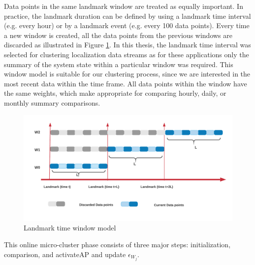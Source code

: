 Data points in the same landmark window are treated as equally important. In practice, the landmark duration can be defined by using a landmark time interval (e.g. every hour) or by a landmark event (e.g. every 100 data points). Every time a new window is created, all the data points from the previous windows are discarded as illustrated in Figure \ref{land}. In this thesis, the landmark time interval was selected for clustering localization data streams as for these applications only the summary of the system state within a particular window was required. This window model is suitable for our clustering process, since we are interested in the most recent data within the time frame. All data points within the window have the same weights, which make appropriate for comparing hourly, daily, or monthly summary comparisons. 




   \begin{figure}[ht]
    \centering
    \includegraphics[width = 11 cm]{image/Chapters/Chapter4/LANDMARK-2.png}
    \caption{Landmark time window model }
    \label{land}
    \end{figure}
 
This online micro-cluster phase consists of three major steps: initialization, comparison, and activateAP and update $\epsilon_{W_j}$. %



